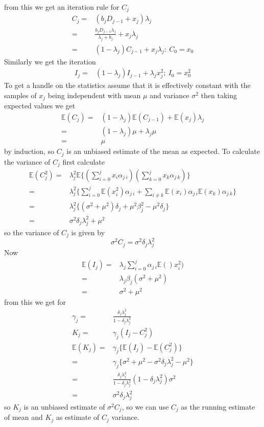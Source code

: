 \documentclass[a4paper,oneside,english]{book}
\numberwithin{equation}{section}
\numberwithin{figure}{section}
\begin{document}
from this we get an iteration rule for $C_j$
\begin{align}
C_j=&(b_j D_{j-1} + x_j)\lambda_j \\
=& \frac{b_j D_{j-1} \lambda_j}{\lambda_j +b_j} +x_j \lambda_j \\
=&(1-\lambda_j)C_{j-1} + x_j \lambda_j : \: C_0=x_0 \label{eq:c_j_iter}
\end{align}
Similarly we get the iteration
\begin{align}
I_j=& (1-\lambda_j)I_{j-1}+\lambda_j x_j^2; \: I_0=x_0^2
\end{align}
To get a handle on the statistics assume that it is effectively constant with the samples of $x_j$ being independent with mean $\mu$ and variance $\sigma^2 $ then taking expected values we get
\begin{align}
\mathbb{E}(C_j)=& (1-\lambda_j)\mathbb{E}(C_{j-1})+\mathbb{E}(x_j)\lambda_j\\
=& (1-\lambda_j)\mu +\lambda_j \mu\\
=&\mu
\end{align}
by induction, so $C_j$ is an unbiased estimate of the mean as expected. 
To calculate the variance of $C_j$ first calculate
\begin{align}
\mathbb{E}(C_j^2)=& \lambda_j ^2  \mathbb{E}\{ (\sum_{i=0}^{j} x_i \alpha_{j\:i} )  (\sum_{k=0}^{j} x_k \alpha_{j\:k} )\}\\
=&\lambda_j ^2  \{\sum_{i=0}^j \mathbb{E}(x_i^2)\alpha_{j\:i}+\sum_{i \ne k} \mathbb{E}(x_i)\alpha_{j\:i}\mathbb{E}(x_k)\alpha_{j\:k}\}\\
=&\lambda_j ^2  \{  (\sigma^2+\mu^2)\delta_j +\mu^2 \beta_j^2 -\mu^2 \delta_j  \}\\
=&\sigma^2 \delta_j  \lambda_j ^2 + \mu^2
\end{align}
so the variance of $C_j$ is given by
\begin{equation}\label{eq:C_j_variance}
\sigma^2 C_j = \sigma^2 \delta_j  \lambda_j ^2 
\end{equation}
Now
\begin{align}
\mathbb{E}(I_j)=&\lambda_j \sum_{i=0}^j \alpha_{j\:i} \mathbb{E}()x_i^2)\\
=&\lambda_j \beta_j (\sigma^2 +\mu^2)\\
=& \sigma^2 +\mu^2
\end{align}
from this we get for
\begin{align}\label{key}
\gamma_j=& \frac{\delta_j \lambda_j^2}{1-\delta_j \lambda_j^2}\\
K_j =& \gamma_j(I_j-C_j^2)\\
\mathbb{E}(K_j)=&\gamma_j \{ \mathbb{E}(I_j)- \mathbb{E}(C_j^2)  \} \\
=& \gamma_j \{ \sigma^2 +\mu^2 -  \sigma^2 \delta_j  \lambda_j ^2 -\mu^2  \}\\
=&  \frac{\delta_j \lambda_j^2}{1-\delta_j \lambda_j^2} (1-\delta_j \lambda_j^2)\sigma^2\\
=&  \sigma^2 \delta_j  \lambda_j ^2 
\end{align}
so  $K_j$ is an unbiased estimate of $ \sigma^2 C_j  $, so we can use $C_j$ as the running estimate of  mean and $K_j$ as  estimate of $C_j$ variance.
\end{document}
